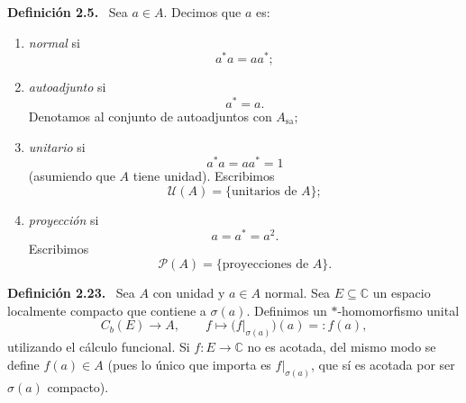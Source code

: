 \documentclass[11pt]{article}
\newcommand{\Asa}{A_{\mathrm{sa}}}
\newcommand{\U}{\mathcal{U}}
\newcommand{\Pj}{\mathcal{P}}
\newenvironment{definicion}[1]
  {\par\medskip\noindent\textbf{Definición #1.}\ }
  {\par\medskip}
\begin{document}
\begin{definicion}{2.5}
Sea $a\in A$. Decimos que $a$ es:
\begin{enumerate}[label=(\roman*),leftmargin=2.2em]
  \item \emph{normal} si
  \[
    a^*a=aa^*;
  \]

  \item \emph{autoadjunto} si
  \[
    a^*=a.
  \]
  Denotamos al conjunto de autoadjuntos con $\Asa$;

  \item \emph{unitario} si
  \[
    a^*a=aa^*=1
  \]
  (asumiendo que $A$ tiene unidad). Escribimos
  \[
    \U(A)=\{\text{unitarios de }A\};
  \]

  \item \emph{proyección} si
  \[
    a=a^*=a^2.
  \]
  Escribimos
  \[
    \Pj(A)=\{\text{proyecciones de }A\}.
  \]
\end{enumerate}
\end{definicion}

\begin{definicion}{2.23}
Sea $A$ con unidad y $a\in A$ normal. Sea $E\subseteq\mathbb{C}$ un espacio localmente compacto que contiene a $\sigma(a)$. Definimos un $*$-homomorfismo unital
\[
  C_b(E)\longrightarrow A,
  \qquad
  f\longmapsto \bigl(f|_{\sigma(a)}\bigr)(a)=:f(a),
\]
utilizando el cálculo funcional. Si $f:E\to\mathbb{C}$ no es acotada, del mismo modo se define $f(a)\in A$ (pues lo único que importa es $f|_{\sigma(a)}$, que sí es acotada por ser $\sigma(a)$ compacto).
\end{definicion}
\end{document}
